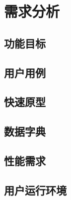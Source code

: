 
\chapter{需求分析}
\label{chap:requirement}

\section{功能目标}
\section{用户用例}
\section{快速原型}
\section{数据字典}
\section{性能需求}
\section{用户运行环境}
